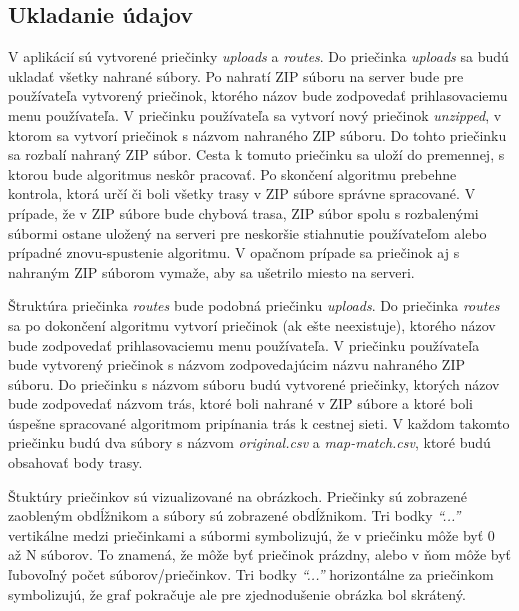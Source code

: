 \subsection{Ukladanie údajov  \label{section:saving-files}}
\indent \indent V aplikácií sú vytvorené priečinky \textit{uploads} a \textit{routes}. Do priečinka \textit{uploads} sa budú ukladať všetky nahrané súbory. Po nahratí ZIP súboru na server bude pre používateľa vytvorený priečinok, ktorého názov bude zodpovedať prihlasovaciemu menu používateľa. V priečinku používateľa sa vytvorí nový priečinok \textit{unzipped}, v ktorom sa vytvorí priečinok s názvom nahraného ZIP súboru. Do tohto priečinku sa rozbalí nahraný ZIP súbor. Cesta k tomuto priečinku sa uloží do premennej, s ktorou bude algoritmus neskôr pracovať. Po skončení algoritmu prebehne kontrola, ktorá určí či boli všetky trasy v ZIP súbore správne spracované. V prípade, že v ZIP súbore bude chybová trasa, ZIP súbor spolu s rozbalenými súbormi ostane uložený na serveri pre neskoršie stiahnutie používateľom alebo prípadné znovu-spustenie algoritmu. V opačnom prípade sa priečinok aj s nahraným ZIP súborom vymaže, aby sa ušetrilo miesto na serveri.

Štruktúra priečinka \textit{routes} bude podobná priečinku \textit{uploads}. Do priečinka \textit{routes} sa po dokončení algoritmu vytvorí priečinok (ak ešte neexistuje), ktorého názov bude zodpovedať prihlasovaciemu menu používateľa. V priečinku používateľa bude vytvorený priečinok s názvom zodpovedajúcim názvu nahraného ZIP súboru. Do priečinku s názvom súboru budú vytvorené priečinky, ktorých názov bude zodpovedať názvom trás, ktoré boli nahrané v ZIP súbore a ktoré boli úspešne spracované algoritmom pripínania trás k cestnej sieti. V každom takomto priečinku budú dva súbory s názvom \textit{original.csv} a \textit{map-match.csv}, ktoré budú obsahovať body trasy.

Štuktúry priečinkov sú vizualizované na obrázkoch. Priečinky sú zobrazené zaobleným obdĺžnikom a súbory sú zobrazené obdĺžnikom. Tri bodky \textit{``...''} vertikálne medzi priečinkami a súbormi symbolizujú, že v priečinku môže byť 0 až N súborov. To znamená, že môže byť priečinok prázdny, alebo v ňom môže byť ľubovoľný počet súborov/priečinkov. Tri bodky \textit{``...''} horizontálne za priečinkom symbolizujú, že graf pokračuje ale pre zjednodušenie obrázka bol skrátený.

